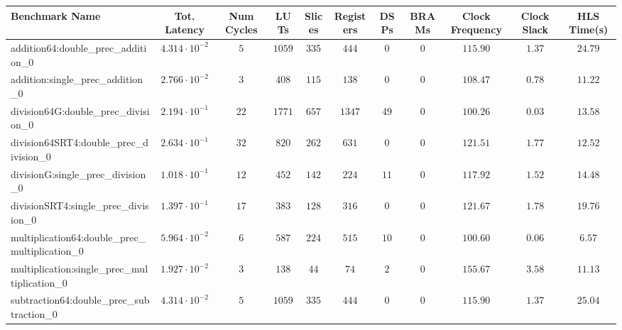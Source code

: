 \begin{tabular}{|l|c|c|c|c|c|c|c|c|c|c|}
\hline
Benchmark Name                                   & Tot. Latency            & Num Cycles & LUTs     & Slices   & Registers & DSPs   & BRAMs & Clock Frequency & Clock Slack & HLS Time(s) \\
\hline
addition64:double\_prec\_addition\_0             & $ 4.314 \cdot 10^{-2} $ & $ 5      $ & $ 1059 $ & $ 335  $ & $ 444   $ & $ 0  $ & $ 0 $ & $ 115.90      $ & $ 1.37    $ & $ 24.79   $ \\
addition:single\_prec\_addition\_0               & $ 2.766 \cdot 10^{-2} $ & $ 3      $ & $ 408  $ & $ 115  $ & $ 138   $ & $ 0  $ & $ 0 $ & $ 108.47      $ & $ 0.78    $ & $ 11.22   $ \\
division64G:double\_prec\_division\_0            & $ 2.194 \cdot 10^{-1} $ & $ 22     $ & $ 1771 $ & $ 657  $ & $ 1347  $ & $ 49 $ & $ 0 $ & $ 100.26      $ & $ 0.03    $ & $ 13.58   $ \\
division64SRT4:double\_prec\_division\_0         & $ 2.634 \cdot 10^{-1} $ & $ 32     $ & $ 820  $ & $ 262  $ & $ 631   $ & $ 0  $ & $ 0 $ & $ 121.51      $ & $ 1.77    $ & $ 12.52   $ \\
divisionG:single\_prec\_division\_0              & $ 1.018 \cdot 10^{-1} $ & $ 12     $ & $ 452  $ & $ 142  $ & $ 224   $ & $ 11 $ & $ 0 $ & $ 117.92      $ & $ 1.52    $ & $ 14.48   $ \\
divisionSRT4:single\_prec\_division\_0           & $ 1.397 \cdot 10^{-1} $ & $ 17     $ & $ 383  $ & $ 128  $ & $ 316   $ & $ 0  $ & $ 0 $ & $ 121.67      $ & $ 1.78    $ & $ 19.76   $ \\
multiplication64:double\_prec\_multiplication\_0 & $ 5.964 \cdot 10^{-2} $ & $ 6      $ & $ 587  $ & $ 224  $ & $ 515   $ & $ 10 $ & $ 0 $ & $ 100.60      $ & $ 0.06    $ & $ 6.57    $ \\
multiplication:single\_prec\_multiplication\_0   & $ 1.927 \cdot 10^{-2} $ & $ 3      $ & $ 138  $ & $ 44   $ & $ 74    $ & $ 2  $ & $ 0 $ & $ 155.67      $ & $ 3.58    $ & $ 11.13   $ \\
subtraction64:double\_prec\_subtraction\_0       & $ 4.314 \cdot 10^{-2} $ & $ 5      $ & $ 1059 $ & $ 335  $ & $ 444   $ & $ 0  $ & $ 0 $ & $ 115.90      $ & $ 1.37    $ & $ 25.04   $ \\

\end{tabular}
